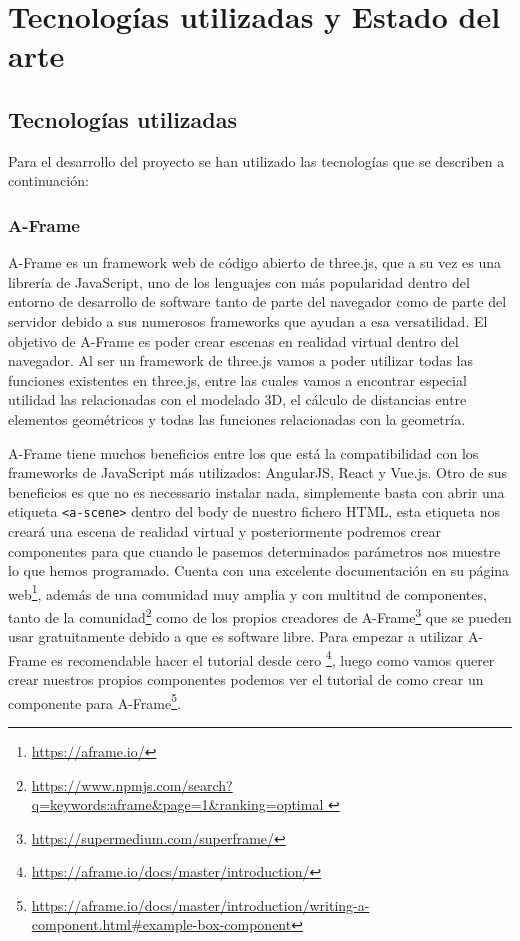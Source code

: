 \documentclass[a4paper, 12pt]{book}
\begin{document}

\cleardoublepage
\chapter{Tecnologías utilizadas y Estado del arte}
\label{chap:estado}

\section{ Tecnologías utilizadas} 
\label{sec:tech}

Para el desarrollo del proyecto se han utilizado las tecnologías que se describen a continuación:

\subsection{ A-Frame} 
\label{sec:aframe}

A-Frame es un framework web de código abierto de three.js, que a su vez es una librería de JavaScript, uno de los lenguajes con más popularidad dentro del entorno de desarrollo de software tanto de parte del navegador como de parte del servidor debido a sus numerosos frameworks que ayudan a esa versatilidad.  El objetivo de A-Frame es poder crear escenas en realidad virtual dentro del navegador. Al ser un framework de three.js vamos a poder utilizar todas las funciones existentes en three.js, entre las cuales vamos a encontrar especial utilidad las relacionadas con el modelado 3D, el cálculo de distancias entre elementos geométricos y todas las funciones relacionadas con la geometría.
 
 A-Frame tiene muchos beneficios entre los que está la compatibilidad con los frameworks de JavaScript más utilizados: AngularJS, React y Vue.js. Otro de sus beneficios es que no es necessario instalar nada, simplemente basta con abrir una etiqueta \texttt{<a-scene>} dentro del body de nuestro fichero HTML, esta etiqueta nos creará una escena de realidad virtual y posteriormente podremos crear componentes para que cuando le pasemos determinados parámetros nos muestre lo que hemos programado. Cuenta con una excelente documentación en su página web\footnote{\url{https://aframe.io/}}, además de una comunidad muy amplia y con multitud de componentes, tanto de la comunidad\footnote{\url{https://www.npmjs.com/search?q=keywords:aframe&page=1&ranking=optimal }} como de los propios creadores de A-Frame\footnote{\url{https://supermedium.com/superframe/}} que se pueden usar gratuitamente debido a que es software libre. Para empezar a utilizar A-Frame es recomendable hacer el tutorial desde cero \footnote{\url{https://aframe.io/docs/master/introduction/}}, luego como vamos querer crear nuestros propios componentes podemos ver el tutorial de como crear un componente para A-Frame\footnote{\url{https://aframe.io/docs/master/introduction/writing-a-component.html#example-box-component}}.
 
\end{document}
